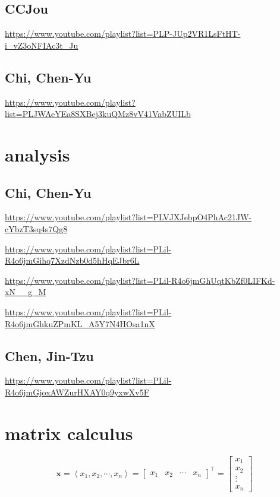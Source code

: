 \documentclass[
]{book}
\theoremstyle{definition}
\theoremstyle{definition}
\theoremstyle{definition}
\theoremstyle{definition}
\theoremstyle{remark}
\begin{document}
\section{CCJou}\label{ccjou}

\url{https://www.youtube.com/playlist?list=PLP-JUp2VR1LsFtHT-i_vZ3oNFIAc3t_Ju}

\section{Chi, Chen-Yu}\label{chi-chen-yu}

\url{https://www.youtube.com/playlist?list=PLJWAeYEa8SXBej3kuQMz8vV41VabZUILb}

\chapter{analysis}\label{analysis}

\section{Chi, Chen-Yu}\label{chi-chen-yu-1}

\url{https://www.youtube.com/playlist?list=PLVJXJebpO4PhAc21JW-cYbzT3sq4s7Qg8}

\url{https://www.youtube.com/playlist?list=PLil-R4o6jmGihq7XzdNzb0d5hHqEJbr6L}

\url{https://www.youtube.com/playlist?list=PLil-R4o6jmGhUqtKbZf0LIFKd-xN__g_M}

\url{https://www.youtube.com/playlist?list=PLil-R4o6jmGhkuZPmKL_A5Y7N4HOsa1nX}

\section{Chen, Jin-Tzu}\label{chen-jin-tzu}

\url{https://www.youtube.com/playlist?list=PLil-R4o6jmGjoxAWZurHXAY0q9yxwXv5F}

\chapter{matrix calculus}\label{matrix-calculus}

\textsuperscript{}

\[
\boldsymbol{x}=\left\langle x_{1},x_{2},\cdots,x_{n}\right\rangle =\begin{bmatrix}x_{1} & x_{2} & \cdots & x_{n}\end{bmatrix}^{\intercal}=\begin{bmatrix}x_{1}\\
x_{2}\\
\vdots\\
x_{n}
\end{bmatrix}
\]
\end{document}
